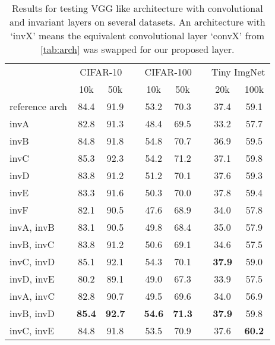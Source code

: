 \begin{table}
  \renewcommand{\arraystretch}{1.2}
  \centering
  \caption{Results for testing VGG like architecture with convolutional and
  invariant layers on several datasets. An architecture with `invX' means the
  equivalent convolutional layer `convX' from \autoref{tab:arch} was swapped for
  our proposed layer.}
  \begin{tabular}{@{}lcclcclcc@{}}
    \toprule
    & \multicolumn{2}{c}{CIFAR-10} & \phantom{abc} & \multicolumn{2}{c}{CIFAR-100} & \phantom{abc} & \multicolumn{2}{c}{Tiny ImgNet} \\ \cline{2-9}
    \phantom{abc} & 10k   &  50k  &&  10k  &  50k && 20k & 100k \\ \midrule
    reference arch & 84.4  & 91.9  && 53.2  & 70.3 && 37.4 & 59.1 \\ \hline
    invA & 82.8 & 91.3 && 48.4 & 69.5 && 33.2 & 57.7 \\
    invB & 84.8 & 91.8  && 54.8  & 70.7 && 36.9& 59.5 \\
    invC & 85.3 & 92.3 && 54.2 & 71.2 && 37.1& 59.8\\
    invD& 83.8 & 91.2 && 51.2 & 70.1 && 37.6 & 59.3 \\
    invE& 83.3 & 91.6 && 50.3 & 70.0 && 37.8 & 59.4\\
    invF& 82.1 & 90.5 && 47.6& 68.9 && 34.0 & 57.8\\ \hline
    invA, invB& 83.1  & 90.5 && 49.8 & 68.4 && 35.0 & 57.9\\
    invB, invC& 83.8  & 91.2 && 50.6 & 69.1 && 34.6 & 57.5\\
    invC, invD& 85.1 & 92.1 && 54.3 & 70.1 && \textbf{37.9} & 59.0\\
    invD, invE& 80.2 & 89.1 && 49.0 & 67.3 && 33.9 & 57.5\\
    invA, invC& 82.8 & 90.7 && 49.5 & 69.6 && 34.0 & 56.9\\
    invB, invD& \textbf{85.4} & \textbf{92.7} && \textbf{54.6} & \textbf{71.3} && \textbf{37.9} & 59.8\\
    invC, invE& 84.8 & 91.8 && 53.5 & 70.9 && 37.6 & \textbf{60.2}\\ \bottomrule
  \end{tabular}\label{tab:conv_results}
\end{table}

